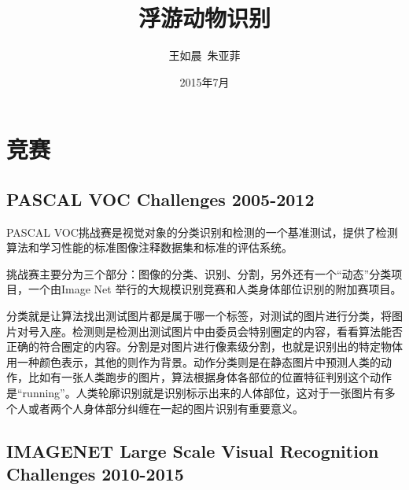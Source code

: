 \documentclass[12pt]{article}
\begin{document}
\title{\vspace{-2em}浮游动物识别\vspace{-0.7em}}
\author{王如晨\ 朱亚菲}
\date{\vspace{-0.7em}2015年7月\vspace{-0.7em}}
\maketitle\thispagestyle{fancy}
\maketitle
\tableofcontents 



\section{竞赛}


\subsection{PASCAL VOC Challenges 2005-2012}

PASCAL VOC挑战赛是视觉对象的分类识别和检测的一个基准测试，提供了检测算法和学习性能的标准图像注释数据集和标准的评估系统。

挑战赛主要分为三个部分：图像的分类、识别、分割，另外还有一个“动态”分类项目，一个由Image Net 举行的大规模识别竞赛和人类身体部位识别的附加赛项目。

分类就是让算法找出测试图片都是属于哪一个标签，对测试的图片进行分类，将图片对号入座。检测则是检测出测试图片中由委员会特别圈定的内容，看看算法能否正确的符合圈定的内容。分割是对图片进行像素级分割，也就是识别出的特定物体用一种颜色表示，其他的则作为背景。动作分类则是在静态图片中预测人类的动作，比如有一张人类跑步的图片，算法根据身体各部位的位置特征判别这个动作是“running”。人类轮廓识别就是识别标示出来的人体部位，这对于一张图片有多个人或者两个人身体部分纠缠在一起的图片识别有重要意义。

\subsection{IMAGENET Large Scale Visual Recognition Challenges 2010-2015}
\end{document}

